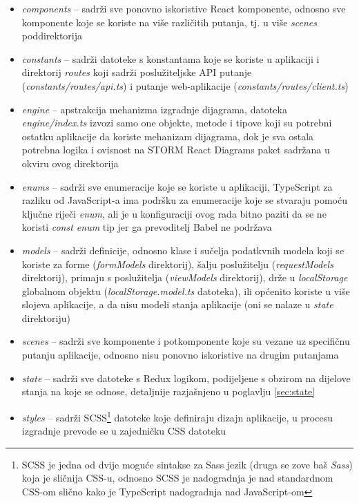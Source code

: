 \documentclass[times, utf8, diplomski, numeric]{fer}
\begin{document}
\begin{itemize}
    \item \emph{components} -- sadrži sve ponovno iskoristive React komponente, odnosno sve komponente koje se koriste na više različitih putanja, tj. u više \emph{scenes} poddirektorija
    \item \emph{constants} -- sadrži datoteke s konstantama koje se koriste u aplikaciji i direktorij \emph{routes} koji sadrži poslužiteljske API putanje (\emph{constants/routes/api.ts}) i putanje web-aplikacije (\emph{constants/routes/client.ts})
    \item \emph{engine} -- apstrakcija mehanizma izgradnje dijagrama, datoteka \emph{engine/index.ts} izvozi samo one objekte, metode i tipove koji su potrebni ostatku aplikacije da koriste mehanizam dijagrama, dok je sva ostala potrebna logika i ovisnost na STORM React Diagrams paket sadržana u okviru ovog direktorija
    \item \emph{enums} -- sadrži sve enumeracije koje se koriste u aplikaciji, TypeScript za razliku od JavaScript-a ima podršku za enumeracije koje se stvaraju pomoću ključne riječi \emph{enum}, ali je u konfiguraciji ovog rada bitno paziti da se ne koristi \emph{const enum} tip jer ga prevoditelj Babel ne podržava
    \item \emph{models} -- sadrži definicije, odnosno klase i sučelja podatkvnih modela koji se koriste za forme (\emph{formModels} direktorij), šalju poslužitelju (\emph{requestModels} direktorij), primaju s poslužitelja (\emph{viewModels} direktorij), drže u \emph{localStorage} globalnom objektu (\emph{localStorage.model.ts} datoteka), ili općenito koriste u više slojeva aplikacije, a da nisu modeli stanja aplikacije (oni se nalaze u \emph{state} direktoriju)
    \item \emph{scenes} -- sadrži sve komponente i potkomponente koje su vezane uz specifičnu putanju aplikacije, odnosno nisu ponovno iskoristive na drugim putanjama
    \item \emph{state} -- sadrži sve datoteke s Redux logikom, podijeljene s obzirom na dijelove stanja na koje se odnose, detaljnije razjašnjeno u poglavlju \ref{sec:state}
    \item \emph{styles} -- sadrži SCSS\footnote{
        SCSS je jedna od dvije moguće sintakse za Sass jezik (druga se zove baš \emph{Sass}) koja je sličnija CSS-u, odnosno SCSS je nadogradnja  je nad standardnom CSS-om slično kako je TypeScript nadogradnja nad JavaScript-om
    } datoteke koje definiraju dizajn aplikacije, u procesu izgradnje prevode se u zajedničku CSS datoteku

\end{itemize}
\end{document}
